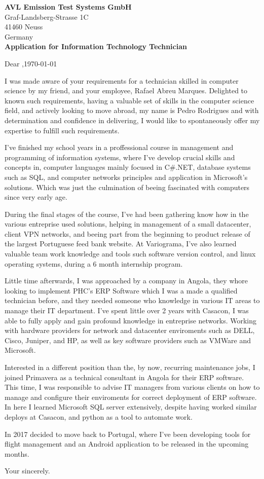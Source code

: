 \documentclass{letter}
\renewcommand*{\opening}[1]{\vspace{2\parskip}%
#1 \toname,\hfill\today\par\nobreak
}
\renewcommand*{\closing}[1]{\par\nobreak\vspace{\parskip}%
\vspace{2\parskip}%
#1\\[6\medskipamount]%
\fromsig
}
\begin{document}
\begin{letter}{}

\textbf{AVL Emission Test Systems GmbH}\\
Graf-Landsberg-Strasse 1C\\
41460 Neuss\\
Germany\\

\textbf{Application for Information Technology Technician}

\opening{Dear}

I was made aware of your requirements for a technician skilled in computer science by my friend,
and your employee, Rafael Abreu Marques. Delighted to known such requirements, having a valuable
set of skills in the computer science field, and actively looking to move abroad, my name is Pedro
Rodrigues and with determination and confidence in delivering, I would like to spontaneously offer
my expertise to fulfill such requirements.

I've finished my school years in a proffessional course in management and programming of
information systems, where I've develop crucial skills and concepts in, computer languages mainly
focused in C\#.NET, database systems such as SQL, and computer networks principles and application
in Microsoft's solutions. Which was just the culmination of beeing fascinated with computers since
very early age.

During the final stages of the course, I've had been gathering know how in the various entreprise
used solutions, helping in management of a small datacenter, client VPN networks, and beeing part
from the beginning to product release of the largest Portuguese feed bank website. At Variograma,
I've also learned valuable team work knowledge and tools such software version control, and linux
operating systems, during a 6 month internship program.

Little time afterwards, I was approached by a company in Angola, they whore looking to implement
PHC's ERP Software which I was a made a qualified technician before, and they needed someone who
knowledge in various IT areas to manage their IT department. I've spent little over 2 years with
Casacon, I was able to fully apply and gain profound knowledge in entreprise networks. Working
with hardware providers for network and datacenter enviroments such as DELL, Cisco, Juniper,
and HP, as well as key software providers such as VMWare and Microsoft.

Interested in a different position than the, by now, recurring maintenance jobs, I joined
Primavera as a technical consultant in Angola for their ERP software. This time, I was responsible
to advise IT managers from various clients on how to manage and configure their enviroments for
correct deployment of ERP software. In here I learned Microsoft SQL server extensively, despite
having worked similar deploys at Casacon, and python as a tool to automate work.

In 2017 decided to move back to Portugal, where I've been developing tools for flight management
and an Android application to be released in the upcoming months.

\closing{Your sincerely.}
\end{letter}
\end{document}
